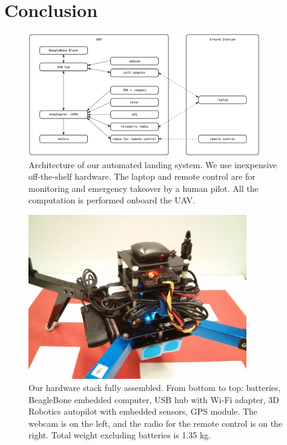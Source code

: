 \documentclass{acm_proc_article-sp}
\begin{document}
\section{Conclusion}


\begin{figure}[h!]
\centering
\includegraphics[width=0.9\textwidth]{images/architecture.png}
\caption{
    Architecture of our automated landing system. We use inexpensive
    off-the-shelf hardware. The laptop and remote control are for
    monitoring and emergency takeover by a human pilot. All the
    computation is performed onboard the UAV.
}
\label{fig:hardware-arch}
\end{figure}

\begin{figure}[h!]
\centering
\includegraphics[width=0.85\textwidth]{images/hardware.jpg}
\caption{
    Our hardware stack fully assembled. From bottom to top: batteries,
    BeagleBone embedded computer, USB hub with Wi-Fi adapter, 3D
    Robotics autopilot with embedded sensors, GPS module. The
    webcam is on the left, and the radio for the remote control is on
    the right. Total weight excluding batteries is 1.35 kg.
}
\label{fig:hardware-photo}
\end{figure}
\end{document}
